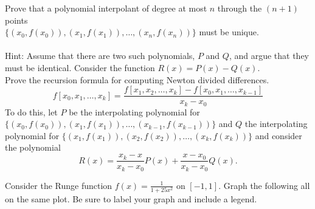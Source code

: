 \documentclass[addpoints, 11pt]{exam}
\newcommand{\ds}{\displaystyle}
\begin{document}
\begin{questions}

\question Prove that a polynomial interpolant of degree at most $n$ through the $(n+1)$ points \\ $\{(x_0, f(x_0)), (x_1, f(x_1)), \dots, (x_n, f(x_n)) \}$ must be unique. \\ \ \\
Hint: Assume that there are two such polynomials, $P$ and $Q$, and argue that they must be identical. Consider the function $R(x)=P(x)-Q(x)$. \\


\question Prove the recursion formula for computing Newton divided differences.
$$
f[x_0,x_1,\dots,x_k] = \frac{f[x_1,x_2,\dots,x_k]-f[x_0,x_1,\dots,x_{k-1}]}{x_k-x_0}
$$
To do this, let $P$ be the interpolating polynomial for $\{(x_0, f(x_0)), (x_1, f(x_1)), \dots, (x_{k-1}, f(x_{k-1})) \}$ and $Q$ the interpolating polynomial for  $\{(x_1, f(x_1)), (x_2, f(x_2)), \dots, (x_{k}, f(x_{k})) \}$ and consider the polynomial
$$
R(x) = \frac{x_k-x}{x_k-x_0}P(x) + \frac{x-x_0}{x_k-x_0}Q(x).
$$

\question Consider the Runge function $\ds f(x) = \frac{1}{1+25x^2}$ on $[-1,1]$. Graph the following all on the same plot. Be sure to label your graph and include a legend.
\end{questions}
\end{document}

